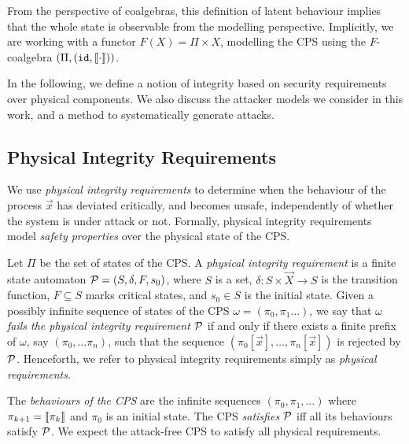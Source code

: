 {From the perspective of coalgebras, this definition of latent behaviour implies that the whole state is observable from the modelling perspective. Implicitly, we are working with a functor $F(X)=\Pi\times X$, modelling the CPS using the $F$-coalgebra $(\Pi,({\texttt{id}},{{{\llbracket\cdot\rrbracket}}}))$. 
}

In the following, we define a notion of integrity based on security requirements over physical components. We also discuss the attacker models we consider in this work, and a method to systematically generate attacks.

\subsection{Physical Integrity Requirements}
We use \emph{physical integrity requirements} to determine when the behaviour of the process $\vec{x}$ has deviated critically, and becomes unsafe, independently of whether the system is under attack or not. Formally, physical integrity requirements model \emph{safety properties} over the physical state of the CPS.
\begin{definition}
  \label{def:CPSRobustness:IntegrityRequirement}
  Let $\Pi$ be the set of states of the CPS. A \emph{physical integrity requirement} is a finite state automaton $\mathcal{P}=(S,\delta,F,s_0)$, where $S$ is a set, $\delta\colon S\times \vec{X}\rightarrow S$ is the transition function, $F\subseteq S$ marks critical states, and $s_0\in S$ is the initial state. Given a possibly infinite sequence of states of the CPS $\omega=(\pi_0,\pi_1 \ldots)$, we say that \emph{$\omega$ fails the physical integrity requirement $\mathcal{P}$} if and only if there exists a finite prefix of $\omega$, say $(\pi_0,\ldots\pi_n)$, such that the sequence $(\pi_0[\vec{x}],\ldots, \pi_n[\vec{x}])$ is rejected by $\mathcal{P}$. Henceforth, we refer to physical integrity requirements simply as \emph{physical requirements}. 
  
The \emph{behaviours of the CPS} are the infinite sequences $(\pi_0, \pi_1, \ldots)$ where $\pi_{k+1}={{\llbracket\pi_k\rrbracket}}$ and $\pi_0$ is an initial state. The CPS \emph{satisfies  $\mathcal{P}$} iff all its behaviours satisfy $\mathcal{P}$. We expect the attack-free CPS to satisfy all physical requirements.
\end{definition}
   

